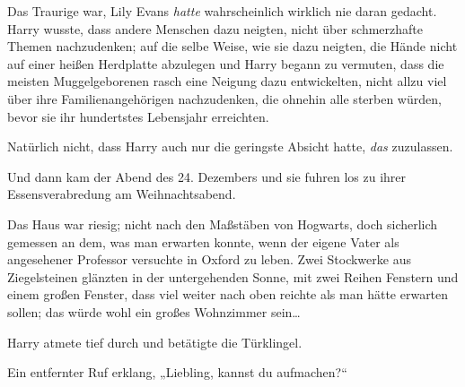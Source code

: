 Das Traurige war, Lily Evans \emph{hatte} wahrscheinlich wirklich nie daran gedacht. Harry wusste, dass andere Menschen dazu neigten, nicht über schmerzhafte Themen nachzudenken; auf die selbe Weise, wie sie dazu neigten, die Hände nicht auf einer heißen Herdplatte abzulegen und Harry begann zu vermuten, dass die meisten Muggelgeborenen rasch eine Neigung dazu entwickelten, nicht allzu viel über ihre Familienangehörigen nachzudenken, die ohnehin alle sterben würden, bevor sie ihr hundertstes Lebensjahr erreichten.

Natürlich nicht, dass Harry auch nur die geringste Absicht hatte, \emph{das} zuzulassen.

Und dann kam der Abend des 24. Dezembers und sie fuhren los zu ihrer Essensverabredung am Weihnachtsabend.

\later

Das Haus war riesig; nicht nach den Maßstäben von Hogwarts, doch sicherlich gemessen an dem, was man erwarten konnte, wenn der eigene Vater als angesehener Professor versuchte in Oxford zu leben. Zwei Stockwerke aus Ziegelsteinen glänzten in der untergehenden Sonne, mit zwei Reihen Fenstern und einem großen Fenster, dass viel weiter nach oben reichte als man hätte erwarten sollen; das würde wohl ein großes Wohnzimmer sein…

Harry atmete tief durch und betätigte die Türklingel.

Ein entfernter Ruf erklang, „Liebling, kannst du aufmachen?“

